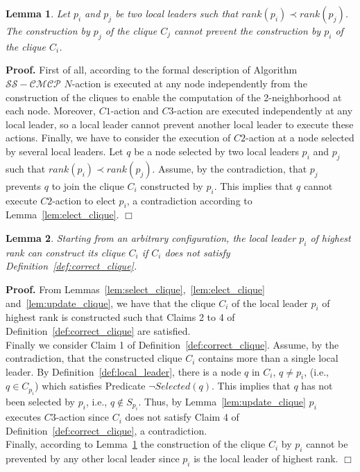\documentclass[11pt,letterpaper,onecolumn]{article}
\newtheorem{lemma}{Lemma}
\newenvironment{proof}{\noindent \begin{rm}{\textbf{Proof.} }}{\hspace*{\fill}$\Box$\par\end{rm} \vspace{.3cm}}
\begin{document}
\begin{lemma}
\label{lem:construct_prio}
Let $p_i$ and $p_j$ be two local leaders such that $rank(p_i) \prec rank(p_j)$. The construction by $p_j$ of the clique $C_j$ cannot prevent the construction by $p_i$ of the clique $C_i$.
\end{lemma}

\begin{proof}
First of all, according to the formal description of Algorithm $\mathcal{SS-CMCP}$ $N$-action is executed at any node independently from the construction of the cliques to enable the computation of the 2-neighborhood at each node. Moreover, $C1$-action and $C3$-action are executed independently at any local leader, so a local leader cannot prevent another local leader to execute these actions. Finally, we have to consider the execution of $C2$-action at a node selected by several local leaders. Let $q$ be a node selected by two local leaders $p_i$ and $p_j$ such that $rank(p_i) \prec rank(p_j)$. Assume, by the contradiction, that $p_j$ prevents $q$ to join the clique $C_i$ constructed by $p_i$. This implies that $q$ cannot execute $C2$-action to elect $p_i$, a contradiction according to Lemma~\ref{lem:elect_clique}.
\end{proof}

\begin{lemma}
\label{lem:construct_clique_prio}
Starting from an arbitrary configuration, the local leader $p_i$ of highest rank can construct its clique $C_i$ if $C_i$ does not satisfy Definition~\ref{def:correct_clique}.
\end{lemma}

\begin{proof}
From Lemmas~\ref{lem:select_clique},~\ref{lem:elect_clique} and~\ref{lem:update_clique}, we have that the clique $C_i$ of the local leader $p_i$ of highest rank is constructed such that Claims 2 to 4 of Definition~\ref{def:correct_clique} are satisfied.\\
Finally we consider Claim 1 of Definition~\ref{def:correct_clique}. Assume, by the contradiction, that the constructed clique $C_i$ contains more than a single local leader. By Definition~\ref{def:local_leader}, there is a node $q$ in $C_i$, $q \neq p_i$, (i.e., $q \in C_{p_i}$) which satisfies Predicate $\neg Selected(q)$. This implies that $q$ has not been selected by $p_i$, i.e., $q \not \in S_{p_i}$. Thus, by Lemma~\ref{lem:update_clique} $p_i$ executes $C3$-action since $C_i$ does not satisfy Claim 4 of Definition~\ref{def:correct_clique}, a contradiction.\\
Finally, according to Lemma~\ref{lem:construct_prio} the construction of the clique $C_i$ by $p_i$ cannot be prevented by any other local leader since $p_i$ is the local leader of highest rank.
\end{proof}
\end{document}
